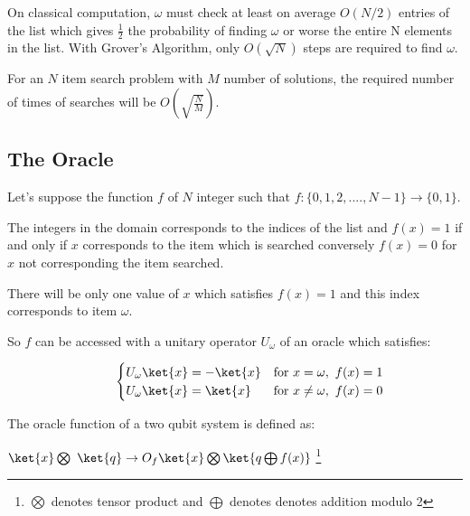 \documentclass{article}
\begin{document}
\noindent
On classical computation, $\omega$ must check at least on average $O(N/2)$ entries of the list which gives $\frac{1}{2}$ the probability of finding $\omega$ or worse the entire N elements in the list.
With Grover's Algorithm, only $O(\sqrt{N})$ steps are required to find $\omega$.
\vspace{5mm}

\noindent
For an $N$ item search problem with $M$ number of solutions, the required number of times of searches will be $O(\sqrt{\frac{N}{M}})$\cite{nielsen_quantum_2010}.
\pagebreak

\subsection{The Oracle}

Let's suppose the function $f$ of $N$ integer such that $f:\{0,1, 2,...., N-1\} \rightarrow{\{0,1\}}$. 
\vspace{5mm}

\noindent
The integers in the domain corresponds to the indices of the list and $f(x) =1$ if and only if $x$ corresponds to the item which is searched conversely $f(x) =0$ for $x$ not corresponding the item searched. 
\vspace{5mm}

\noindent
There will be only one value of $x$ which satisfies $f(x)=1$ and this index corresponds to item $\omega$\cite{noauthor_grovers_2022}.
\vspace{5mm}

\noindent
So $f$ can be accessed with a unitary operator $U_{\omega}$ of  an oracle which satisfies:
\vspace{5mm}

$\hspace{30mm} \begin{cases}
      U_{\omega}\ket{x} = -\ket{x}  & \text{for} \ x = \omega, \ f(x) =1 \\
       U_{\omega}\ket{x} = \ket{x}  & \text{for} \ x \neq \omega, \ f(x) = 0 \\
\end{cases}$
\vspace{5mm}

The oracle function of a two qubit system is defined as\cite{hui_qc_2019}:
\vspace{5mm}

\qquad $\ket{x} \bigotimes\ \ket{q} \rightarrow{O_f} \ket{x} \bigotimes \ket{q \bigoplus f(x)}$ \footnote{$\bigotimes$ denotes tensor product and $\bigoplus$ denotes denotes addition modulo 2}
\vspace{5mm}
\end{document}
